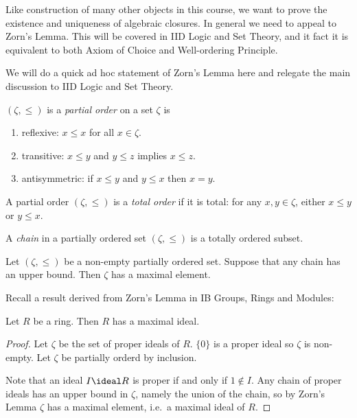 \documentclass[a4paper]{article}
\begin{document}
Like construction of many other objects in this course, we want to prove the existence and uniqueness of algebraic closures. In general we need to appeal to Zorn's Lemma. This will be covered in IID Logic and Set Theory, and it fact it is equivalent to both Axiom of Choice and Well-ordering Principle.

We will do a quick ad hoc statement of Zorn's Lemma here and relegate the main discussion to IID Logic and Set Theory.

\begin{definition}
  \((\zeta, \leq)\) is a \emph{partial order} on a set \(\zeta\) is
  \begin{enumerate}
  \item reflexive: \(x \leq x\) for all \(x \in \zeta\).
  \item transitive: \(x \leq y\) and \(y \leq z\) implies \(x \leq z\).
  \item antisymmetric: if \(x \leq y\) and \(y \leq x\) then \(x = y\).
  \end{enumerate}
\end{definition}

\begin{definition}
  A partial order \((\zeta, \leq)\) is a \emph{total order} if it is total: for any \(x, y \in \zeta\), either \(x \leq y\) or \(y \leq x\).
\end{definition}

\begin{definition}[Chain]
  A \emph{chain} in a partially ordered set \((\zeta, \leq)\) is a totally ordered subset.
\end{definition}

\begin{theorem}
  Let \((\zeta, \leq)\) be a non-empty partially ordered set. Suppose that any chain has an upper bound. Then \(\zeta\) has a maximal element.
\end{theorem}

Recall a result derived from Zorn's Lemma in IB Groups, Rings and Modules:

\begin{lemma}
  Let \(R\) be a ring. Then \(R\) has a maximal ideal.
\end{lemma}

\begin{proof}
  Let \(\zeta\) be the set of proper ideals of \(R\). \(\{0\}\) is a proper ideal so \(\zeta\) is non-empty. Let \(\zeta\) be partially orderd by inclusion.

  Note that an ideal \(I \ideal R\) is proper if and only if \(1 \notin I\). Any chain of proper ideals has an upper bound in \(\zeta\), namely the union of the chain, so by Zorn's Lemma \(\zeta\) has a maximal element, i.e.\ a maximal ideal of \(R\).
\end{proof}
\end{document}
